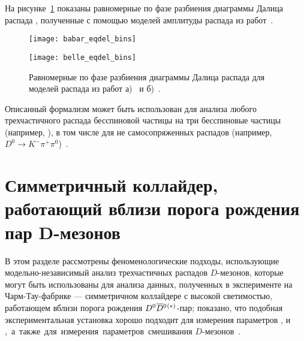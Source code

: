 На рисунке~\ref{fig:binned_dalitz} показаны равномерные по фазе разбиения диаграммы Далица распада \dnkpp, полученные с помощью моделей амплитуды распада из работ~\cite{belle_gamma_dalitz_model,babar_gamma_dalitz_model}.
\begin{figure}[htb]
\begin{minipage}[b]{0.5\textwidth}
 \centering
  \texttt{[image: babar\_eqdel\_bins]}
 \subcaption{}
 \label{fig:bd_babar_eqph}
\end{minipage}
\begin{minipage}[b]{0.5\textwidth}
 \centering
  \texttt{[image: belle\_eqdel\_bins]}
 \subcaption{}
 \label{fig:bd_belle_eqph}
\end{minipage}
 \caption{Равномерные по фазе разбиения диаграммы Далица распада \dnkpp для моделей распада из работ а)~\cite{babar_gamma_dalitz_model} и б)~\cite{belle_gamma_dalitz_model}.}
 \label{fig:binned_dalitz}
\end{figure}

Описанный формализм может быть использован для анализа любого трехчастичного распада бесспиновой частицы на три бесспиновые частицы (например, \bdpp), в том числе для не самосопряженных распадов (например, $D^0\to K^-\pi^+\pi^0$)~\cite{mixing}.

\section{Симметричный коллайдер, работающий вблизи порога рождения пар D-мезонов} \label{sec:charm-tau-phenom}
В этом разделе рассмотрены феноменологические подходы, использующие модельно-независимый анализ трехчастичных распадов $D$-мезонов, которые могут быть использованы для анализа данных, полученных в эксперименте на Чарм-Тау-фабрике --- симметричном коллайдере с высокой светимостью, работающем вблизи порога рождения $D^0\overline{D}{}^0{}^{(*)}$-пар;  показано, что подобная экспериментальная установка хорошо подходит для измерения параметров \ki, \ci и \si, а также для измерения параметров смешивания $D$-мезонов~\cite{mixing}.

